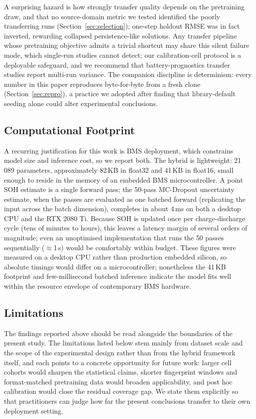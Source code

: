 A surprising hazard is how strongly transfer quality depends on the pretraining
draw, and that no source-domain metric we tested identified the poorly
transferring runs (Section~\ref{sec:selection}); one-step holdout RMSE was in
fact inverted, rewarding collapsed persistence-like solutions. Any transfer
pipeline whose pretraining objective admits a trivial shortcut may share this
silent failure mode, which single-run studies cannot detect; our
calibration-cell protocol is a deployable safeguard, and we recommend that
battery-prognostics transfer studies report multi-run variance. The companion
discipline is determinism: every number in this paper reproduces byte-for-byte
from a fresh clone (Section~\ref{sec:repro}), a practice we adopted after finding
that library-default seeding alone could alter experimental conclusions.

\subsection{Computational Footprint}

A recurring justification for this work is BMS deployment, which constrains model
size and inference cost, so we report both.
The hybrid is lightweight: 21\,089 parameters, approximately 82\,KB in float32
and 41\,KB in float16, small enough to reside in the memory of an embedded BMS
microcontroller.
A point SOH estimate is a single forward pass; the 50-pass MC-Dropout
uncertainty estimate, when the passes are evaluated as one batched forward
(replicating the input across the batch dimension), completes in about 4\,ms on
both a desktop CPU and the RTX 2080 Ti.
Because SOH is updated once per charge-discharge cycle (tens of minutes to
hours), this leaves a latency margin of several orders of magnitude; even an
unoptimised implementation that runs the 50 passes sequentially
($\approx$1\,s) would be comfortably within budget.
These figures were measured on a desktop CPU rather than production embedded
silicon, so absolute timings would differ on a microcontroller; nonetheless the
41\,KB footprint and few-millisecond batched inference indicate the model fits
well within the resource envelope of contemporary BMS hardware.

\subsection{Limitations}

The findings reported above should be read alongside the boundaries of the
present study. The limitations listed below stem mainly from dataset scale and
the scope of the experimental design rather than from the hybrid framework
itself, and each points to a concrete opportunity for future work: larger cell
cohorts would sharpen the statistical claims, shorter fingerprint windows and
format-matched pretraining data would broaden applicability, and post hoc
calibration would close the residual coverage gap. We state them explicitly so
that practitioners can judge how far the present conclusions transfer to their
own deployment setting.

